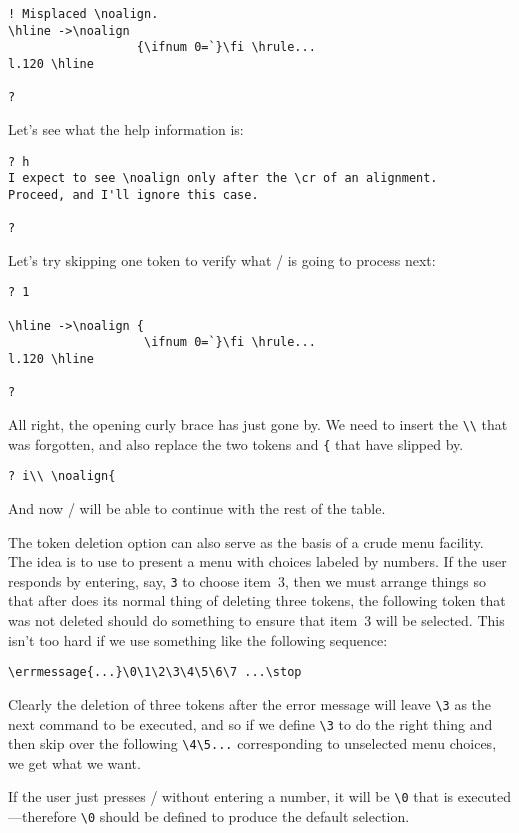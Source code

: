 {\begin{example}
\begin{examplebox}
\begin{verbatim}
! Misplaced \noalign.
\hline ->\noalign
                  {\ifnum 0=`}\fi \hrule...
l.120 \hline

?
\end{verbatim}
Let's see what the help information is:
\begin{verbatim}
? h
I expect to see \noalign only after the \cr of an alignment.
Proceed, and I'll ignore this case.

?
\end{verbatim}
Let's try skipping one token to verify what \latex/ is going
to process next:
\begin{verbatim}
? 1

\hline ->\noalign {
                   \ifnum 0=`}\fi \hrule...
l.120 \hline

?
\end{verbatim}
All right, the opening curly brace has just gone by. We need
to insert the \verb|\\| that was forgotten, and also replace the two tokens
 and \verb|{| that have slipped by.
\begin{verbatim}
? i\\ \noalign{
\end{verbatim}
And now \latex/ will be able to continue with the rest of the table.
\end{examplebox}
\end{example}

The token deletion option can also serve as the basis of a crude menu
facility. The idea is to use  to present a menu with
choices labeled by numbers. If the user responds by entering, say,
\verb;3; to choose item~3, then we must arrange things so that after
 does its normal thing of deleting three tokens, the
following token that was not deleted should do something to ensure
that item~3 will be selected. This isn't too hard if we use something
like the following sequence:
\begin{verbatim}
\errmessage{...}\0\1\2\3\4\5\6\7 ...\stop
\end{verbatim}
Clearly the deletion of three tokens after the error message will leave
\verb;\3; as the next command to be executed, and so if we define
\verb;\3; to do the right thing and then skip over the following
\verb;\4\5...; corresponding to unselected menu choices, we get what we
want.

If the user just presses \return/ without entering a number, it will
be \verb;\0; that is executed---therefore \verb|\0| should be defined
to produce the default selection.

}
